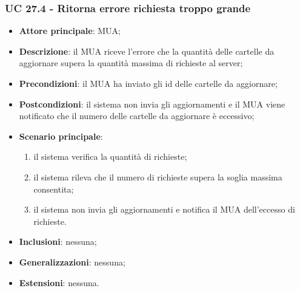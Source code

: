     \subsubsection{UC 27.4 - Ritorna errore richiesta troppo grande} \label{sec:UC27.4}
    \begin{itemize}
        \item \textbf{Attore principale}: MUA;
        \item \textbf{Descrizione}: il MUA riceve l'errore che la quantità delle cartelle da aggiornare supera la quantità massima di richieste al server;
        \item \textbf{Precondizioni}: il MUA ha inviato gli id delle cartelle da aggiornare;
        \item \textbf{Postcondizioni}: il sistema non invia gli aggiornamenti e il MUA viene notificato che il numero delle cartelle da aggiornare è eccessivo;
        \item \textbf{Scenario principale}:
            \begin{enumerate}
                \item il sistema verifica la quantità di richieste;
                \item il sistema rileva che il numero di richieste supera la soglia massima consentita;
                \item il sistema non invia gli aggiornamenti e notifica il MUA dell'eccesso di richieste.
            \end{enumerate}
        \item \textbf{Inclusioni}: nessuna;
        \item \textbf{Generalizzazioni}: nessuna;
        \item \textbf{Estensioni}: nessuna.
    \end{itemize}

